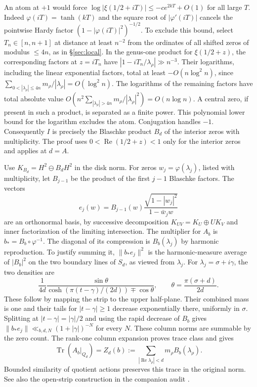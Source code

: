 \documentclass[11pt,letterpaper]{article}
\newcommand{\re}{\operatorname{Re}}\newcommand{\im}{\operatorname{Im}}
\newcommand{\Tr}{\operatorname{Tr}}\newcommand{\supp}{\operatorname{supp}}
\newcommand{\step}[1]{\par\smallskip{\color{ink}\bfseries #1}\enspace}
\begin{document}
\clearpage
\step{The two infinite ends.} An atom at \(+1\) would force \(\log|\xi(1/2+iT)|\le-c e^{2kT}+O(1)\) for all large \(T\). Indeed \(\varphi(iT)=\tanh(kT)\) and the square root of \(|\varphi'(iT)|\) cancels the pointwise Hardy factor \((1-|\varphi(iT)|^2)^{-1/2}\). To exclude this bound, select \(T_n\in[n,n+1]\) at distance at least \(n^{-2}\) from the ordinates of all shifted zeros of modulus \(\le4n\), as in \S\ref{sec:local}. In the genus-one product for \(\xi(1/2+z)\), the corresponding factors at \(z=iT_n\) have \(|1-iT_n/\lambda_\rho|\gg n^{-3}\). Their logarithms, including the linear exponential factors, total at least \(-O(n\log^2 n)\), since \(\sum_{0<|\lambda_\rho|\le4n}m_\rho/|\lambda_\rho|=O(\log^2 n)\). The logarithms of the remaining factors have total absolute value \(O(n^2\sum_{|\lambda_\rho|>4n}m_\rho/|\lambda_\rho|^2)=O(n\log n)\). A central zero, if present in such a product, is separated as a finite power. This polynomial lower bound for the logarithm excludes the atom. Conjugation handles \(-1\). Consequently \(I\) is precisely the Blaschke product \(B_d\) of the interior zeros with multiplicity. The proof uses \(0<\re(1/2+z)<1\) only for the interior zeros and applies at \(d=A\).

\step{Taking the quotient trace.}
Use \(K_{B_d}=H^2\ominus B_d H^2\) in the disk norm. For zeros \(w_j=\varphi(\lambda_j)\), listed with multiplicity, let \(B_{j-1}\) be the product of the first \(j-1\) Blaschke factors. The vectors
\[
 e_j(w)=B_{j-1}(w)\frac{\sqrt{1-|w_j|^2}}{1-\bar w_jw}
\]
are an orthonormal basis, by successive decomposition \(K_{UV}=K_U\oplus U K_V\) and inner factorization of the limiting intersection. The multiplier for \(A_b\) is \(b_*=B_b\circ\varphi^{-1}\). The diagonal of its compression is \(B_b(\lambda_j)\) by harmonic reproduction. To justify summing it, \(\|b_*e_j\|^2\) is the harmonic-measure average of \(|B_b|^2\) on the two boundary lines of \(S_d\), as viewed from \(\lambda_j\). For \(\lambda_j=\sigma+i\gamma\), the two densities are
\[
 \frac{1}{4d}\frac{\sin\theta}{\cosh(\pi(t-\gamma)/(2d))\mp\cos\theta},
 \qquad \theta=\frac{\pi(\sigma+d)}{2d}.
\]
These follow by mapping the strip to the upper half-plane. Their combined mass is one and their tails for \(|t-\gamma|\ge1\) decrease exponentially there, uniformly in \(\sigma\). Splitting at \(|t-\gamma|=|\gamma|/2\) and using the rapid decrease of \(B_b\) gives \(\|b_*e_j\|\ll_{b,d,N}(1+|\gamma|)^{-N}\) for every \(N\). These column norms are summable by the zero count. The rank-one column expansion proves trace class and gives
\begin{equation}
 \Tr(A_b|_{Q_d})=Z_d(b):=\sum_{|\re\lambda_\rho|<d}m_\rho B_b(\lambda_\rho).
 \label{eq:qd}
\end{equation}
Bounded similarity of quotient actions preserves this trace in the original norm. See also the open-strip construction in the companion audit \cite[\S 6]{audit}.
\end{document}
